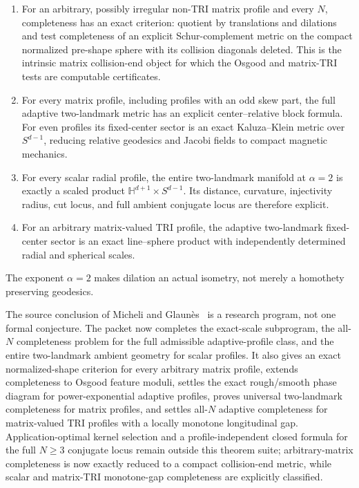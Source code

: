 \documentclass[11pt]{article}
\begin{document}
\begin{enumerate}
  matrix-valued TRI profile with locally monotone longitudinal gap
  \(\delta_\parallel\), the all-\(N\) criterion is exact: for \(N\ge3\),
  completeness holds exactly when \(\alpha=2\) and
  \(\int_0dr/\sqrt{\delta_\parallel(r)}=\infty\).  The tangential gap does
  not enter.
\item For an arbitrary, possibly irregular non-TRI matrix profile and every
  \(N\), completeness has an exact criterion: quotient by translations and
  dilations and test completeness of an explicit Schur-complement metric on
  the compact normalized pre-shape sphere with its collision diagonals
  deleted.  This is the intrinsic matrix collision-end object for which the
  Osgood and matrix-TRI tests are computable certificates.
\item For every matrix profile, including profiles with an odd skew part,
  the full adaptive two-landmark metric has an explicit center--relative
  block formula.  For even profiles its fixed-center sector is an exact
  Kaluza--Klein metric over \(S^{d-1}\), reducing relative geodesics and
  Jacobi fields to compact magnetic mechanics.
\item For every scalar radial profile, the entire two-landmark manifold at
  \(\alpha=2\) is exactly a scaled product
  \(\mathbb H^{d+1}\times S^{d-1}\).  Its distance, curvature, injectivity
  radius, cut locus, and full ambient conjugate locus are therefore explicit.
\item For an arbitrary matrix-valued TRI profile, the adaptive
  two-landmark fixed-center sector is an exact line--sphere product with
  independently determined radial and spherical scales.
\end{enumerate}
The exponent \(\alpha=2\) makes dilation an actual isometry, not merely a
homothety preserving geodesics.

The source conclusion of Micheli and Glaun\`es~\cite{MG} is a research
program, not one formal conjecture.  The packet now completes the exact-scale
subprogram, the all-\(N\) completeness problem for the full admissible
adaptive-profile class, and the entire two-landmark ambient geometry for
scalar profiles.  It also gives an exact normalized-shape criterion for
every arbitrary matrix profile, extends completeness to Osgood feature moduli,
settles the exact rough/smooth phase diagram for power-exponential adaptive
profiles, proves universal two-landmark completeness for matrix profiles,
and settles all-\(N\) adaptive completeness for matrix-valued TRI profiles
with a locally monotone longitudinal gap.  Application-optimal kernel
selection and a profile-independent closed formula for the full \(N\ge3\)
conjugate locus remain outside this theorem suite; arbitrary-matrix
completeness is now exactly reduced to a compact collision-end metric, while
scalar and matrix-TRI monotone-gap completeness are explicitly classified.
\end{document}
